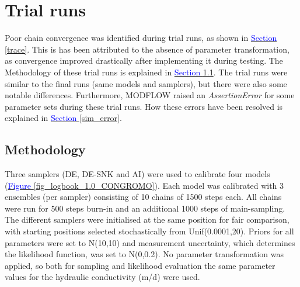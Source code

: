 \section{Trial runs}\label{trial_and_error}
Poor chain convergence was identified during trial runs, as shown in \hyperref[trace]{\textcolor{blue}{Section }\ref{trace}}. This is has been attributed to the absence of parameter transformation, as convergence improved drastically after implementing it during testing. The Methodology of these trial runs is explained in \hyperref[trial_method]{\textcolor{blue}{Section }\ref{trial_method}}. The trial runs were similar to the final runs (same models and samplers), but there were also some notable differences. 
Furthermore, MODFLOW raised an \textit{AssertionError} for some parameter sets during these trial runs. How these errors have been resolved is explained in \hyperref[sim_error]{\textcolor{blue}{Section }\ref{sim_error}}.

\subsection{Methodology}\label{trial_method}
Three samplers (DE, DE-SNK and AI) were used to calibrate four models (\hyperref[fig_logbook_1.0_CONGROMO]{\textcolor{blue}{Figure }\ref{fig_logbook_1.0_CONGROMO}}). Each model was calibrated with 3 ensembles (per sampler) consisting of 10 chains of 1500 steps each. All chains were run for 500 steps burn-in and an additional 1000 steps of main-sampling. The different samplers were initialised at the same position for fair comparison, with starting positions selected stochastically from Unif(0.0001,20). Priors for all parameters were set to N(10,10) and measurement uncertainty, which determines the likelihood function, was set to N(0,0.2). No parameter transformation was applied, so both for sampling and likelihood evaluation the same parameter values for the hydraulic conductivity (m/d) were used. 

